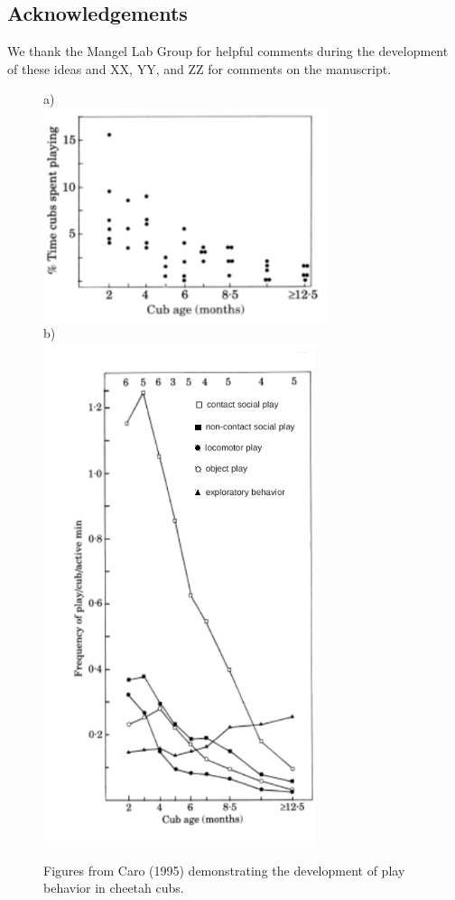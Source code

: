 \documentclass[12pt, letterpaper, fleqn]{article}
\begin{document}

\subsection*{Acknowledgements}
We thank the Mangel Lab Group for helpful comments during the development of these ideas and XX, YY, and ZZ for comments on the manuscript.

	\clearpage
	\thispagestyle{empty}
	\begin{figure}[h!]
	\caption{Figures from Caro (1995) demonstrating the development of play behavior in cheetah cubs.}
	  \begin{center}
	    \begin{minipage}[t]{0.49\linewidth}
	      a)\\
	      \includegraphics[width=83mm]{caroFig1edit.pdf}\\
	      b)\\
	      \includegraphics[width=80mm]{caroFig2edit.pdf}

\end{minipage}
\end{center}
\end{figure}
\end{document}
